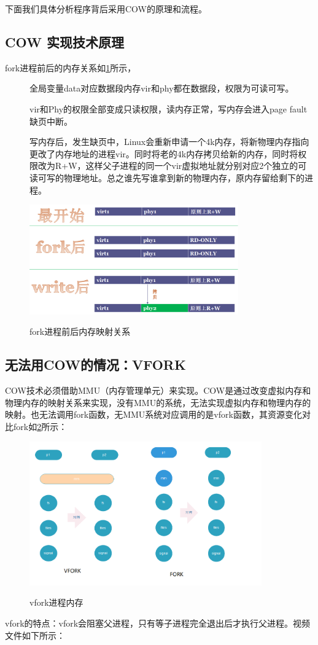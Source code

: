 下面我们具体分析程序背后采用COW的原理和流程。\\
\subsection{COW 实现技术原理}
fork进程前后的内存关系如\ref{linux_fork_mem_compare}所示，
\begin{description}
  \item[] 全局变量data对应数据段内存vir和phy都在数据段，权限为可读可写。
  \item[] vir和Phy的权限全部变成只读权限，读内存正常，写内存会进入page fault缺页中断。
  \item[] 写内存后，发生缺页中，Linux会重新申请一个4k内存，将新物理内存指向更改了内存地址的进程vir。同时将老的4k内存拷贝给新的内存，同时将权限改为R+W，这样父子进程的同一个vir虚拟地址就分别对应2个独立的可读可写的物理地址。总之谁先写谁拿到新的物理内存，原内存留给剩下的进程。
\end{description}
\begin{figure}[H]
 \wdfigbox
  {\caption{fork进程前后内存映射关系}\label{linux_fork_mem_compare}}
  {
  \includegraphics[width=9cm]{./figure/cow_fork_virmem_compare.png}
  }
\end{figure}
\subsection{无法用COW的情况：VFORK}
COW技术必须借助MMU（内存管理单元）来实现。COW是通过改变虚拟内存和物理内存的映射关系来实现，没有MMU的系统，无法实现虚拟内存和物理内存的映射。也无法调用fork函数，无MMU系统对应调用的是vfork函数，其资源变化对比fork如\ref{vfork_mem}所示：
\begin{figure}[H]
 \wdfigbox
  {\caption{vfork进程内存}\label{vfork_mem}}
  {
  \includegraphics[width=10cm]{./figure/vfork_mem.png}
  }
\end{figure}
vfork的特点：vfork会阻塞父进程，只有等子进程完全退出后才执行父进程。视频文件如下所示：

